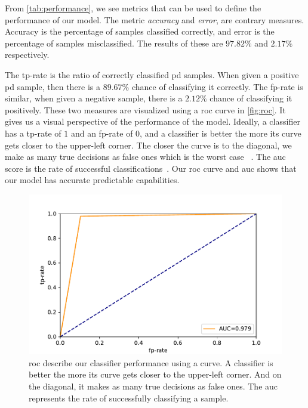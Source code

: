 From \autoref{tab:performance}, we see metrics that can be used to define the performance of our model. The metric \emph{accuracy} and \emph{error}, are contrary measures. Accuracy is the percentage of samples classified correctly, and error is the percentage of samples misclassified. The results of these are $97.82\%$ and $2.17\%$ respectively.



The tp-rate is the ratio of correctly classified \ac{pd} samples. When given a positive \ac{pd} sample, then there is a $89.67\%$ chance of classifying it correctly. The fp-rate is similar, when given a negative sample, there is a $2.12\%$ chance of classifying it positively. These two measures are visualized using a \ac{roc} curve in \autoref{fig:roc}. It gives us a visual perspective of the performance of the model. Ideally, a classifier has a tp-rate of $1$ and an fp-rate of $0$, and a classifier is better the more its curve gets closer to the upper-left corner. The closer the curve is to the diagonal, we make as many true decisions as false ones which is the worst case ~\cite[p.~563]{alpaydin2014introduction}. The \ac{auc} score is the rate of successful classifications~\cite{bradley1997use}. Our \ac{roc} curve and \ac{auc} shows that our model has accurate predictable capabilities.

\begin{figure}[ht]
    \centering
    \includegraphics[width=\textwidth]{results/roc.pdf}
    \caption[\project's \acl{roc} curve]{\acl{roc} describe our classifier performance using a curve. A classifier is better the more its curve gets closer to the upper-left corner. And on the diagonal, it makes as many true decisions as false ones. The \acl{auc} represents the rate of successfully classifying a sample.}
    \label{fig:roc}
\end{figure} 

